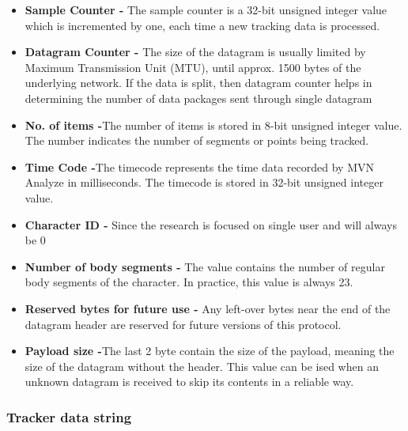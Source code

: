 \begin{itemize}
    \item \textbf{Sample Counter - }The sample counter is a 32-bit unsigned integer value which is incremented by one, each time a new tracking data is processed.
    \item \textbf{Datagram Counter - }The size of the datagram is usually limited by Maximum Transmission Unit (MTU), until approx. 1500 bytes of the underlying network. If the data is split, then datagram counter helps in determining the number of data packages sent through single datagram
    \item \textbf{No. of items -}The number of items is stored in 8-bit unsigned integer value. The number indicates the number of segments or points being tracked.
    \item \textbf{Time Code -}The timecode represents the time data recorded by MVN Analyze in milliseconds. The timecode is stored in 32-bit unsigned integer value.
    \item \textbf{Character ID -} Since the research is focused on single user and will always be 0
    \item \textbf{Number of body segments -} The value contains the number of regular body segments of the character. In practice, this value is always 23.
    \item \textbf{Reserved bytes for future use -} Any left-over bytes near the end of the datagram header are reserved for future versions of this protocol.
    \item \textbf{Payload size -}The last 2 byte contain the size of the payload, meaning the size of the datagram without the header. This value can be ised when an unknown datagram is received to skip its contents in a reliable way.
\end{itemize}

\subsubsection{Tracker data string}

